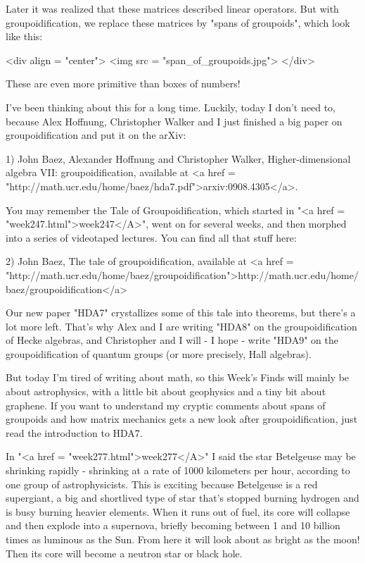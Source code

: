 Later it was realized that these matrices described linear operators.
But with groupoidification, we replace these matrices by "spans
of groupoids", which look like this:

<div align = "center">
<img src = "span_of_groupoids.jpg">
</div>

These are even more primitive than boxes of numbers!

I've been thinking about this for a long time.  Luckily, today I don't
need to, because Alex Hoffnung, Christopher Walker and I just finished
a big paper on groupoidification and put it on the arXiv:

1) John Baez, Alexander Hoffnung and Christopher Walker, 
Higher-dimensional algebra VII: groupoidification, available 
at <a href = "http://math.ucr.edu/home/baez/hda7.pdf">arxiv:0908.4305</a>.

You may remember the Tale of Groupoidification, which started in
"<a href = "week247.html">week247</A>", went on for several
weeks, and then morphed into a series of videotaped lectures.  You can
find all that stuff here:

2) John Baez, The tale of groupoidification, available at 
<a href = "http://math.ucr.edu/home/baez/groupoidification">http://math.ucr.edu/home/baez/groupoidification</a>

Our new paper "HDA7" crystallizes some of this tale into theorems, 
but there's a lot more left.  That's why Alex and I are writing
"HDA8" on the groupoidification of Hecke algebras, and Christopher
and I will - I hope - write "HDA9" on the groupoidification of 
quantum groups (or more precisely, Hall algebras).

But today I'm tired of writing about math, so this Week's Finds will
mainly be about astrophysics, with a little bit about geophysics and a
tiny bit about graphene.  If you want to understand my cryptic
comments about spans of groupoids and how matrix mechanics gets a new
look after groupoidification, just read the introduction to HDA7.

In "<a href = "week277.html">week277</A>" I said the star
Betelgeuse may be shrinking rapidly - shrinking at a rate of 1000
kilometers per hour, according to one group of astrophysicists.  This
is exciting because Betelgeuse is a red supergiant, a big and
shortlived type of star that's stopped burning hydrogen and is busy
burning heavier elements.  When it runs out of fuel, its core will
collapse and then explode into a supernova, briefly becoming between 1
and 10 billion times as luminous as the Sun.  From here it will look
about as bright as the moon!  Then its core will become a neutron star
or black hole.

